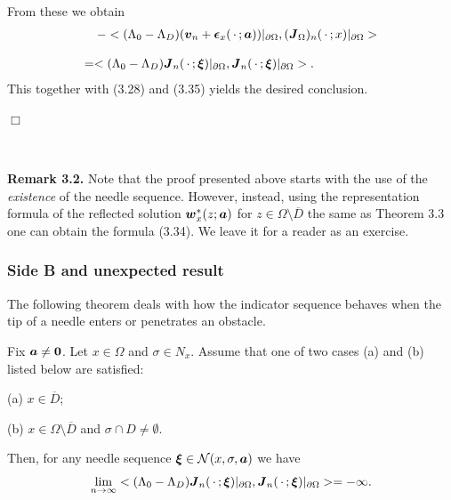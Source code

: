 From these we obtain
$$\begin{array}{l}
\displaystyle
\,\,\,\,\,\,
-<(\Lambda_0-\Lambda_D)(\mbox{\boldmath $v$}_n
+\mbox{\boldmath $\epsilon$}_x(\,\cdot\,;\mbox{\boldmath $a$}))\vert_{\partial\Omega},
(\mbox{\boldmath $J$}_{\Omega})_n(\,\cdot\,;x)\vert_{\partial\Omega}>
\\
\\
\displaystyle
=<(\Lambda_0-\Lambda_D)\mbox{\boldmath $J$}_n(\,\cdot\,;\mbox{\boldmath $\xi$})\vert_{\partial\Omega},
\mbox{\boldmath $J$}_n(\,\cdot\,;\mbox{\boldmath $\xi$})\vert_{\partial\Omega}>.
\end{array}
$$
This together with (3.28) and (3.35) yields the desired conclusion.

\noindent
$\Box$

$\quad$

{\bf\noindent Remark 3.2.}
Note that the proof presented above starts with the use of the {\it existence} of the needle sequence.
However, instead, using the representation formula of the reflected solution $\mbox{\boldmath $w$}_x^*(z;\mbox{\boldmath $a$})$ for $z\in\Omega\setminus\overline{D}$ the same as Theorem 3.3
one can obtain the formula (3.34).
We leave it for a reader as an exercise.




\subsubsection{Side B and unexpected result}



The following theorem deals with how the indicator sequence behaves when the tip of a needle enters or penetrates an obstacle.






  Fix $\mbox{\boldmath $a$}\not=\mbox{\boldmath $0$}$.
Let $x\in\Omega$ and $\sigma\in N_x$.  Assume that one of two cases (a) and (b) listed below are satisfied:

\noindent
(a) $x\in\overline{D}$;


\noindent
(b) $x\in\Omega\setminus\overline{D}$ and $\sigma\cap D\not=\emptyset$.


\noindent
Then, for any needle sequence $\mbox{\boldmath $\xi$}\in{\cal N}(x,\sigma,\mbox{\boldmath $a$})$ we have
$$\displaystyle
\lim_{n\rightarrow\infty}
<(\Lambda_0-\Lambda_D)\mbox{\boldmath $J$}_n(\,\cdot\,;\mbox{\boldmath $\xi$})\vert_{\partial\Omega},
\mbox{\boldmath $J$}_n(\,\cdot\,;\mbox{\boldmath $\xi$})\vert_{\partial\Omega}>
=-\infty.
$$

